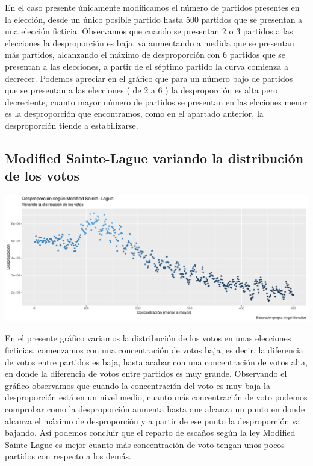 \documentclass[12pt,a4paper,]{book}
\numberwithin{dummy}{section}
\theoremstyle{ocrenumbox}
\theoremstyle{blacknumex}
\theoremstyle{blacknumbox}
\theoremstyle{ocrenum}
\theoremstyle{ocrenum}
\begin{document}
En el caso presente únicamente modificamos el número de partidos
presentes en la elección, desde un único posible partido hasta 500
partidos que se presentan a una elección ficticia. Observamos que cuando
se presentan 2 o 3 partidos a las elecciones la desproporción es baja,
va aumentando a medida que se presentan más partidos, alcanzando el
máximo de desproporción con 6 partidos que se presentan a las
elecciones, a partir de el séptimo partido la curva comienza a decrecer.
Podemos apreciar en el gráfico que para un número bajo de partidos que
se presentan a las elecciones ( de 2 a 6 ) la desproporción es alta pero
decreciente, cuanto mayor número de partidos se presentan en las
elcciones menor es la desproporción que encontramos, como en el apartado
anterior, la desproporción tiende a estabilizarse.

\hypertarget{modified-sainte-lague-variando-la-distribuciuxf3n-de-los-votos}{%
\subsection{Modified Sainte-Lague variando la distribución de los
votos}\label{modified-sainte-lague-variando-la-distribuciuxf3n-de-los-votos}}

\begin{center}\includegraphics[width=0.95\linewidth]{figurasR/unnamed-chunk-24-1} \end{center}

En el presente gráfico variamos la distribución de los votos en unas
elecciones ficticias, comenzamos con una concentración de votos baja, es
decir, la diferencia de votos entre partidos es baja, hasta acabar con
una concentración de votos alta, en donde la diferencia de votos entre
partidos es muy grande. Observando el gráfico observamos que cuando la
concentración del voto es muy baja la desproporción está en un nivel
medio, cuanto más concentración de voto podemos comprobar como la
desproporción aumenta hasta que alcanza un punto en donde alcanza el
máximo de desproporción y a partir de ese punto la desproporción va
bajando. Así podemos concluir que el reparto de escaños según la ley
Modified Sainte-Lague es mejor cuanto más concentración de voto tengan
unos pocos partidos con respecto a los demás.
\end{document}
